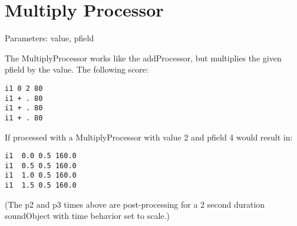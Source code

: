 \section{Multiply Processor}\label{multiplyProcessor}

Parameters: value, pfield

The MultiplyProcessor works like the addProcessor, but multiplies the
given pfield by the value. The following score:

\begin{verbatim}
i1 0 2 80
i1 + . 80
i1 + . 80
i1 + . 80
\end{verbatim}

If processed with a MultiplyProcessor with value 2 and pfield 4 would
result in:

\begin{verbatim}
i1  0.0 0.5 160.0
i1  0.5 0.5 160.0
i1  1.0 0.5 160.0
i1  1.5 0.5 160.0
\end{verbatim}

(The p2 and p3 times above are post-processing for a 2 second duration
soundObject with time behavior set to scale.)
